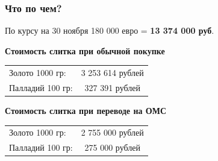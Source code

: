 \documentclass{beamer}
\newcommand{\col}{\textcolor[rgb]{0.2,0.,0.55}}
\begin{document}
		\begin{frame}
			\frametitle{Что по чем?}	
				По курсу на 30 ноября 180 000 евро = \textbf{13 374 000 руб}.
			  
			  \vspace{10pt}
			  \begin{center}
			  \textbf{\col{Стоимость слитка при обычной покупке}}
			  \vspace{5pt}
				\begin{tabular}{lc}
					Золото 1000 гр:  & 3 253 614	рублей \\
					Палладий 100 гр: &  327 391 рублей
				\end{tabular}

				\vspace{10pt}
			  \textbf{\col{Стоимость слитка при переводе на ОМС}}
			  \vspace{5pt}
				\begin{tabular}{lc}
					Золото 1000 гр:  & 2 755 000	рублей \\
					Палладий 100 гр: &  275 000 рублей
				\end{tabular}
    		\end{center}
		\end{frame}
		
\end{document}
